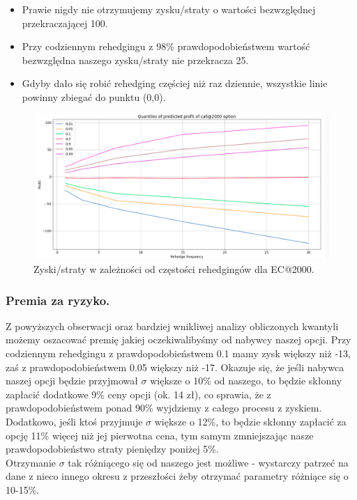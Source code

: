 \documentclass[12pt]{article}
\begin{document}
\begin{itemize}
    \item Prawie nigdy nie otrzymujemy zysku/straty o wartości bezwzględnej przekraczającej 100.
    \item Przy codziennym rehedgingu z 98\% prawdopodobieństwem wartość bezwzględna naszego zysku/straty nie przekracza 25.
    \item Gdyby dało się robić rehedging częściej niż raz dziennie, wszystkie linie powinny zbiegać do punktu (0,0).
\end{itemize}
\begin{figure}[H]
    \centering
    \includegraphics[width=\textwidth,height=\textheight,keepaspectratio]{kwantyle.png}
    \caption{Zyski/straty w zależności od częstości rehedgingów dla EC@2000.}
    \label{fig:kwantyle}
\end{figure}
\subsubsection{Premia za ryzyko.}
Z powyższych obserwacji oraz bardziej wnikliwej analizy obliczonych kwantyli możemy oszacować premię jakiej oczekiwalibyśmy od nabywcy naszej opcji. Przy codziennym rehedgingu z prawdopodobieństwem 0.1 mamy zysk większy niż -13, zaś z prawdopodobieństwem 0.05 większy niż -17. Okazuje się, że jeśli nabywca naszej opcji będzie przyjmował $\sigma$ większe o 10\% od naszego, to będzie skłonny zapłacić dodatkowe 9\% ceny opcji (ok. 14 zł), co sprawia, że z prawdopodobieństwem ponad 90\% wyjdziemy z całego procesu z zyskiem. Dodatkowo, jeśli ktoś przyjmuje $\sigma$ większe o 12\%, to będzie skłonny zapłacić za opcję 11\% więcej niż jej pierwotna cena, tym samym zmniejszając nasze prawdopodobieństwo straty pieniędzy poniżej 5\%.\\
Otrzymanie $\sigma$ tak różniącego się od naszego jest możliwe - wystarczy patrzeć na dane z nieco innego okresu z przeszłości żeby otrzymać parametry różniące się o 10-15\%.
\end{document}
